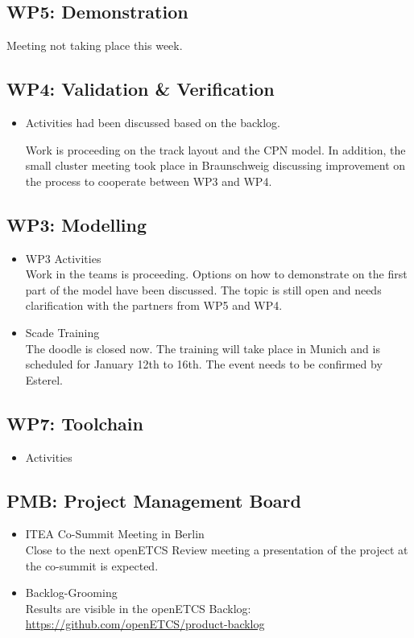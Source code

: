 \documentclass[a4paper, 11pt]{article}
\begin{document}
\subsection{WP5: Demonstration}

Meeting not taking place this week.

\subsection{WP4: Validation \& Verification}
\begin{itemize}
\item Activities
had been discussed based on the backlog.

Work is proceeding on the track layout and the CPN model. In addition, the small cluster meeting took place in Braunschweig discussing improvement on the process to cooperate between WP3 and WP4.

\end{itemize}

\subsection{WP3: Modelling}
\begin{itemize}

\item WP3 Activities\\
Work in the teams is proceeding. Options on how to demonstrate on the first part of the model have been discussed. The topic is still open and needs clarification with the partners from WP5 and WP4.

\item Scade Training\\
The doodle is closed now. The training will take place in Munich and is scheduled for January 12th to 16th. The event needs to be confirmed by Esterel.

\end{itemize}

\subsection{WP7: Toolchain}

\begin{itemize}
\item Activities

\end{itemize}

\subsection{PMB: Project Management Board}
\begin{itemize}
\item ITEA Co-Summit Meeting in Berlin\\
Close to the next openETCS Review meeting a presentation of the project at the co-summit is expected. 

\item Backlog-Grooming\\
Results are visible in the openETCS Backlog: \url{https://github.com/openETCS/product-backlog}
\end{itemize}
\end{document}
